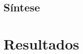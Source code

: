 \section{Síntese}
\label{sec:metodologia-sintese}


\chapter{Resultados}
\label{sec:metodologia-rsl}
\label{sec:metodologia-requisitos}




\appendix



